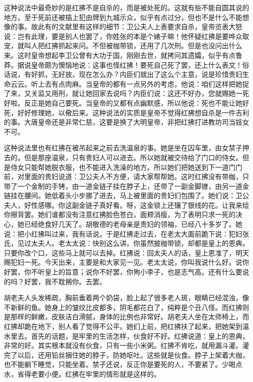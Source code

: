 这种说法中最奇妙的是红拂不是自杀的，而是被处死的。这就有些不能自圆其说的地方。至于死前还被插上犯由牌到九城示众，似乎有点过分，但也不是什么不能想像的事。故此有的文献里有这样的细节：卫公夫人上表要求自杀，皇帝览表大怒说：岂有此理，要是别人也罢了，你姓张的本是个婊子嘛！他怀疑红拂是要哗众取宠，就叫人把红拂抓起来问。不但被枷带锁，还用了几次刑。但是也没问出什么来。这时皇帝想起李卫公曾有大功于国，刚刚去世，就拷问其遗孀，似乎有点鲁莽。据说皇帝颇为懊恼地说：这事也怪红拂！要死自己死了罢，还上什么表文！俗话说，有好抓，无好放，现在怎么办？内臣们就出了这么个主意，说是珍惜贵妇生命云云。听上去有点肉麻。当皇帝的都有一点另外的考虑，他说：咱们这样把她捉了来，又关监又用刑，就让她回家去说吗？内臣们说：这还不好办，您就赐她一死好啦。反正是她自己要死。当皇帝的又都有点幽默感，所以他说：死也不能让她好死，好好修理她，以儆后来。这种说法的实质是皇帝不觉得红拂想自杀是一件吉利的事。大唐皇帝还是非常仁慈，这要是换了大明皇帝，非把红拂打进教坊司当妓女不可。 

这种说法里也有红拂在被吊起来之前去洗温泉的事。她是坐在囚车里，由女禁子押去的。但是那座温泉，只有贵妇人可以进去。所以她就被交待给了门口的侍女。但是侍女只能帮她脱衣服，也不能进入洗澡的地方。所以她们把她送到下一道门门前，对里面的贵妇说道：卫公夫人不方便，请大家帮帮她。这时红拂没有带枷，只带了一个金制的手铐，由一道金链子挂在脖子上，还带了一副金脚镣，由另一道金链挂在腰间。她低着头小步挪了进去，马上被里面的贵妇们包围了。她们说：卫公夫人，好性感哪。你这副金链子真好看。呀，这金锁上还镶了银线的花。让我来绘你擦背罢。她们谁都没有注意红拂脸色苍白，面颊消瘦，为了表明只求一死的决心，她已经绝食好几天了。胡敬德的老母亲是贵妇的领袖，已经八十多岁了。她说：把小红拂叫过来，我有话说。于是红拂走过去，在老太大面前跪下说：犯妇张氏，见过太夫人。老太太说：快别这么讲。你虽然披枷带锁，却都是皇上的恩典。只要你改个口，这些马上就可以去掉。红拂说：回太夫人的话，皇上恩准了，明天赐犯妇一死。今天出来，主要是和大家见一见。老太太说，你叫我说什么好。说你好罢，你不听皇上的旨意；说你不好罢，你殉小李子，也是志气高。还有什么要说的吗？好罢，我不耽搁你。去罢。 

胡老夫人头发稀疏，胸前垂着两个奶袋，脸上起了很多老人斑，眼睛已经混浊，像不新鲜的鱼。她身上的皱纹比皮都多，阴毛都花白了，纯粹是个丑八怪。而红拂则是那样的鲜嫩，皮肤洁白滑腻，身体的比例也非常好。胡老夫人坐在太师椅上，而红拂却跪在地下，别人看了觉得不公平。她们上前，把红拂扶了起来，把她架到温水里去。首先的话题，是牢里的生活怎样，伙食好不好。红拂说道：皇上的恩典，非常的好。其实根本就没有伙食，只有一些小米粥。红拂不肯吃，就用漏斗灌。灌完了以后，还用铅丝捆住她的脖子，防她呕吐。这些就是伙食。脖子上架着大枷，也不能躺下睡觉，只能坐着。禁子还说，反正你是要死的人，不要紧了。少喝点水，省得老要小便。红拂在牢里的情形就是这样的。 

